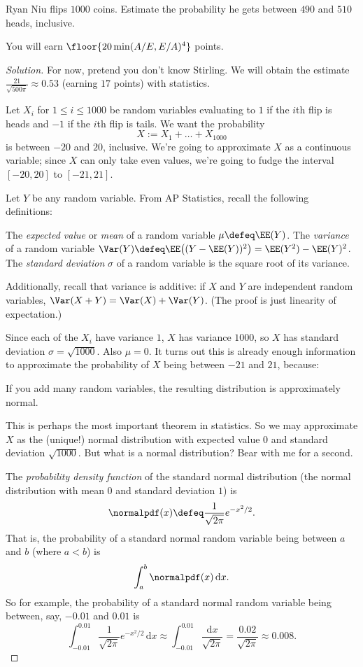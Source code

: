 \documentclass[11pt]{scrartcl}
\renewenvironment{solution}{\renewcommand\qedsymbol{$\blacksquare$}\begin{proof}[Solution]}{\end{proof}}
\begin{document}
\begin{example}\label{exa:ryan_stats}
	Ryan Niu flips $1000$ coins. Estimate the probability he gets between $490$ and $510$ heads, inclusive.

	You will earn $\floor{20\min(A/E,E/A)^4}$ points.
\end{example}

\begin{solution}
	For now, pretend you don't know Stirling. We will obtain the estimate $\frac{21}{\sqrt{500\pi}} \approx 0.53$ (earning $17$ points) with statistics.

	Let $X_i$ for $1 \le i \le 1000$ be random variables evaluating to $1$ if the $i$th flip is heads and $-1$ if the $i$th flip is tails. We want the probability
	\[X := X_1 + \dots + X_{1000}\]
	is between $-20$ and $20$, inclusive. We're going to approximate $X$ as a continuous variable; since $X$ can only take even values, we're going to fudge the interval $[-20,20]$ to $[-21,21]$.

	Let $Y$ be any random variable. From AP Statistics, recall the following definitions:
	\begin{itemize}
    	\ii The \emph{expected value} or \emph{mean} of a random variable $\mu \defeq \EE(Y)$.
    	\ii The \emph{variance} of a random variable $\Var(Y) \defeq \EE\big((Y - \EE(Y))^2\big) = \EE(Y^2) - \EE(Y)^2$.
            \ii The \emph{standard deviation} $\sigma$ of a random variable is the square root of its variance.
	\end{itemize}
    Additionally, recall that variance is additive: if $X$ and $Y$ are independent random variables, $\Var(X + Y) = \Var(X) + \Var(Y)$. (The proof is just linearity of expectation.)

	Since each of the $X_i$ have variance $1$, $X$ has variance $1000$, so $X$ has standard deviation $\sigma = \sqrt{1000}$. Also $\mu = 0$. It turns out this is already enough information to approximate the probability of $X$ being between $-21$ and $21$, because:
	\begin{theorem}
		If you add many random variables, the resulting distribution is approximately normal.
	\end{theorem}
	This is perhaps the most important theorem in statistics. So we may approximate $X$ as the (unique!) normal distribution with expected value $0$ and standard deviation $\sqrt{1000}$. But what is a normal distribution? Bear with me for a second.

	The \emph{probability density function} of the standard normal distribution (the normal distribution with mean $0$ and standard deviation $1$) is
	\[\normalpdf(x) \defeq \frac1{\sqrt{2\pi}}e^{-x^2/2}.\]
	That is, the probability of a standard normal random variable being between $a$ and $b$ (where $a < b$) is
	\[\int_a^b\normalpdf(x) \, \mathrm dx.\]
	So for example, the probability of a standard normal random variable being between, say, $-0.01$ and $0.01$ is
	\[\int_{-0.01}^{0.01}\frac1{\sqrt{2\pi}}e^{-x^2/2}\,\mathrm dx \approx \int_{-0.01}^{0.01}\frac{\mathrm dx}{\sqrt{2\pi}} = \frac{0.02}{\sqrt{2\pi}} \approx 0.008.\]


\end{solution}
\end{document}
